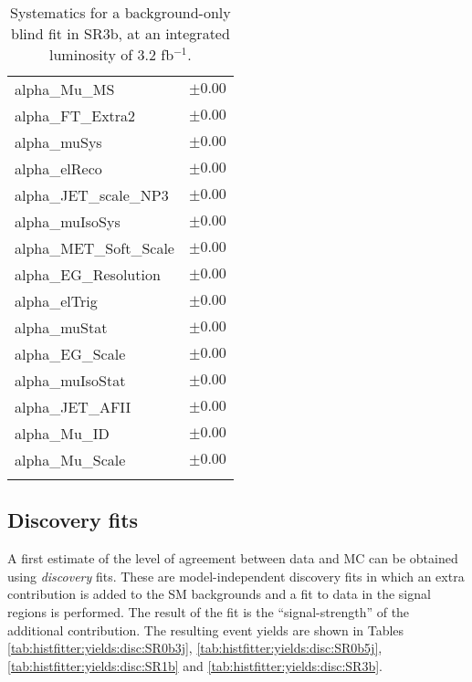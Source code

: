 \begin{table}
\begin{center}
\begin{tabular*}{\textwidth}{@{\extracolsep{\fill}}lc}
alpha\_Mu\_MS         & $\pm 0.00$       \\
alpha\_FT\_Extra2         & $\pm 0.00$       \\
alpha\_muSys         & $\pm 0.00$       \\
alpha\_elReco         & $\pm 0.00$       \\
alpha\_JET\_scale\_NP3         & $\pm 0.00$       \\
alpha\_muIsoSys         & $\pm 0.00$       \\
alpha\_MET\_Soft\_Scale         & $\pm 0.00$       \\
alpha\_EG\_Resolution         & $\pm 0.00$       \\
alpha\_elTrig         & $\pm 0.00$       \\
alpha\_muStat         & $\pm 0.00$       \\
alpha\_EG\_Scale         & $\pm 0.00$       \\
alpha\_muIsoStat         & $\pm 0.00$       \\
alpha\_JET\_AFII         & $\pm 0.00$       \\
alpha\_Mu\_ID         & $\pm 0.00$       \\
alpha\_Mu\_Scale         & $\pm 0.00$       \\
\noalign{\smallskip}\hline\noalign{\smallskip}
\end{tabular*}
\end{center}
\caption{Systematics for a background-only blind fit in SR3b, at an integrated luminosity of 3.2 fb$^{-1}$.}
\label{tab:histfitter:syst:bgonly:SR3b}
\end{table}
%

\subsection{Discovery fits}
A first estimate of the level of agreement between data and MC can be obtained using \textit{discovery} fits. 
These are model-independent discovery fits in which an extra contribution is added to the SM backgrounds and a fit to data in the signal regions is performed. 
The result of the fit is the ``signal-strength'' of the additional contribution. 
The resulting event yields are shown in Tables \ref{tab:histfitter:yields:disc:SR0b3j}, \ref{tab:histfitter:yields:disc:SR0b5j}, 
\ref{tab:histfitter:yields:disc:SR1b} and \ref{tab:histfitter:yields:disc:SR3b}.

